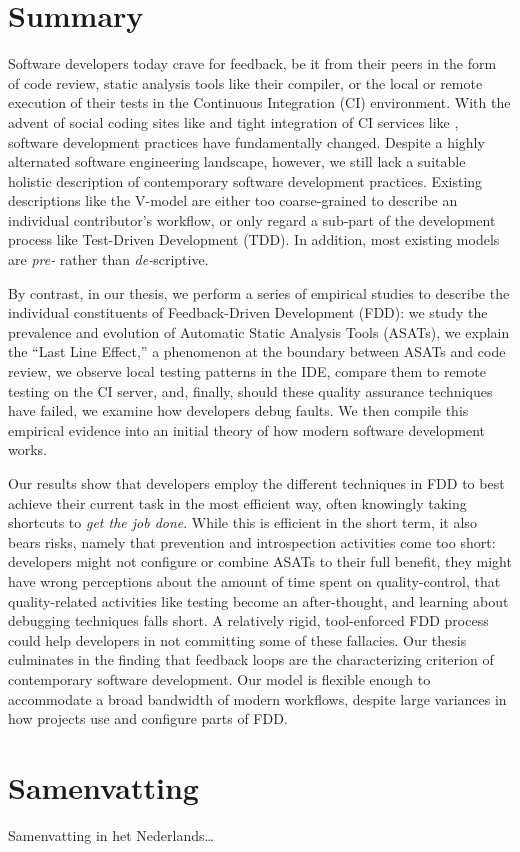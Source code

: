 \chapter*{Summary}

Software developers today crave for feedback, be it from their peers in the form of code review,
static analysis tools like their compiler, or the local or remote execution of their tests in the
Continuous Integration (CI) environment. With the advent of social coding sites like \github and
tight integration of CI services like \travis, software development practices have fundamentally
changed.  Despite a highly alternated software engineering landscape, however, we still lack a
suitable holistic description of contemporary software development practices. Existing descriptions
like the V-model are either too coarse-grained to describe an individual contributor's workflow, or
only regard a sub-part of the development process like Test-Driven Development (TDD). In addition,
most existing models are \emph{pre-} rather than \emph{de-}scriptive.

By contrast, in our thesis, we perform a series of empirical studies to describe the individual
constituents of Feedback-Driven Development (FDD): we study the prevalence and evolution of
Automatic Static Analysis Tools (ASATs), we explain the ``Last Line Effect,'' a phenomenon at the
boundary between ASATs and code review, we observe local testing patterns in the IDE, compare them
to remote testing on the CI server, and, finally, should these quality assurance techniques have
failed, we examine how developers debug faults. We then compile this empirical evidence into an
initial theory of how modern software development works.

Our results show that developers employ the different techniques in FDD to best achieve their
current task in the most efficient way, often knowingly taking shortcuts to \emph{get the job
  done}. While this is efficient in the short term, it also bears risks, namely that prevention and
introspection activities come too short: developers might not configure or combine ASATs to their
full benefit, they might have wrong perceptions about the amount of time spent on quality-control,
that quality-related activities like testing become an after-thought, and learning about debugging
techniques falls short. A relatively rigid, tool-enforced FDD process could help developers in not
committing some of these fallacies. Our thesis culminates in the finding that feedback loops are
the characterizing criterion of contemporary software development. Our model is flexible enough to
accommodate a broad bandwidth of modern workflows, despite large variances in how projects use and
configure parts of FDD.

\chapter*{Samenvatting}

{

Samenvatting in het Nederlands\ldots

}

